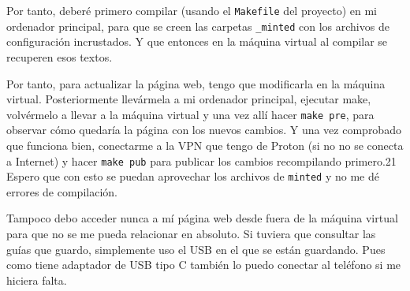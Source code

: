 \documentclass{article}
\begin{document}
    Por tanto, deberé primero compilar (usando el \texttt{Makefile} del
    proyecto) en mi ordenador principal, para que se creen las carpetas
    \texttt{\_minted} con los archivos de configuración incrustados. Y que
    entonces en la máquina virtual al compilar se recuperen esos textos.

    Por tanto, para actualizar la página web, tengo que modificarla en la
    máquina virtual. Posteriormente llevármela a mi ordenador principal,
    ejecutar make, volvérmelo a llevar a la máquina virtual y una vez allí
    hacer \texttt{make pre}, para observar cómo quedaría la página con los
    nuevos cambios. Y una vez comprobado que funciona bien, conectarme
    a la VPN que tengo de Proton (si no no se conecta a Internet) y hacer
    \texttt{make pub} para publicar los cambios recompilando primero.21
    Espero que con esto se puedan aprovechar los archivos de \texttt{minted}
    y no me dé errores de compilación.

    Tampoco debo acceder nunca a mí página web desde fuera de la máquina
    virtual para que no se me pueda relacionar en absoluto. Si tuviera que
    consultar las guías que guardo, simplemente uso el USB en el que se están
    guardando. Pues como tiene adaptador de USB tipo C también lo puedo
    conectar al teléfono si me hiciera falta.
\end{document}
